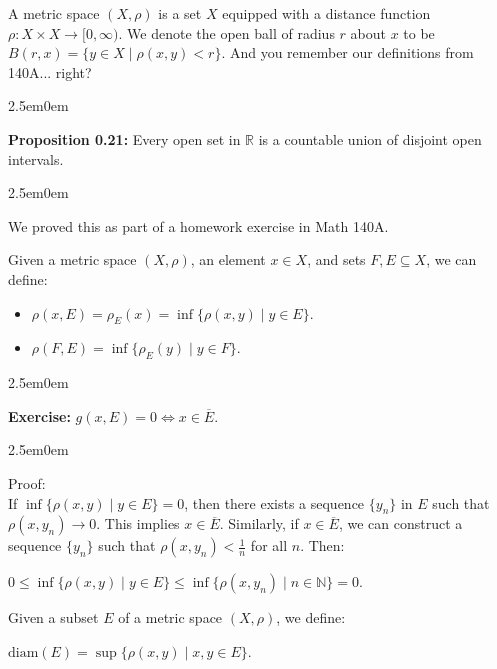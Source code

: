 \documentclass{book}
\newcommand{\hOne}{%
   \color{Black}%
   \fontsize{14}{16}\selectfont%
}
\newcommand{\hTwo}{%
\color{MidnightBlue}%
   \fontsize{13}{15}\selectfont%
}
\newcommand{\myComment}{%
   \color{RawerSienna}%
   \fontsize{12}{14}\selectfont%
}
\newcommand{\exOne}{%
   \color{Purple}%
   \fontsize{13}{15}\selectfont%
}
\newcommand{\exTwoP}{%
   \color{RedViolet}%
   \fontsize{13}{15}\selectfont%
}
\newcommand{\exPP}{%
   \color{RedViolet}%
   \fontsize{12}{14}\selectfont%
}
\newenvironment{myIndent}{%
   \begin{adjustwidth}{2.5em}{0em}%
}{%
   \end{adjustwidth}%
}
\newcommand{\blab}[1]{\textbf{#1}}
\newcommand{\diam}{\mathrm{diam}}
\newcommand{\retTwo}{\hfill\bigbreak}
\begin{document}
A metric space $(X, \rho)$ is a set $X$ equipped with a distance function\\ $\rho: X \times X \longrightarrow [0, \infty)$. We denote the open ball of radius $r$ about $x$ to be\\ $B(r, x) = \{y \in X \mid \rho(x, y) < r\}$. And you remember our definitions from\\ 140A... right?\retTwo


\begin{myIndent}\hTwo
	\blab{Proposition 0.21:} Every open set in $\mathbb{R}$ is a countable union of disjoint open intervals.
		
	\begin{myIndent}\myComment
		We proved this as part of a homework exercise in Math 140A.\retTwo
	\end{myIndent}
\end{myIndent}

\exOne Given a metric space $(X, \rho)$, an element $x \in X$, and sets $F, E \subseteq X$, we can define:
\begin{itemize}
	\item $\rho(x, E) = \rho_E(x) = \inf\{\rho(x, y) \mid y \in E\}$.
	\item $\rho(F, E) = \inf\{\rho_E(y) \mid y \in F\}$.
\end{itemize}


\begin{myIndent}\exTwoP
	\blab{Exercise:} $g(x, E) = 0 \Longleftrightarrow x \in \overline{E}$.
	
	\begin{myIndent}\exPP
		Proof:\\
		If $\inf\{\rho(x, y) \mid y \in E\} = 0$, then there exists a sequence $\{y_n\}$ in $E$ such that\\ $\rho(x, y_n) \rightarrow 0$. This implies $x \in \overline{E}$. Similarly, if $x \in \overline{E}$, we can construct a sequence $\{y_n\}$ such that $\rho(x, y_n) < \frac{1}{n}$ for all $n$. Then:
		
		{\centering $0 \leq \inf\{\rho(x, y) \mid y \in E\} \leq \inf\{\rho(x, y_n) \mid n \in \mathbb{N}\} = 0$.\retTwo\par}
	\end{myIndent}
\end{myIndent}

\hOne
Given a subset $E$ of a metric space $(X, \rho)$, we define:

{\centering$\diam(E) = \sup\{\rho(x, y)\mid x, y \in E\}$.\retTwo\par}
\end{document}
